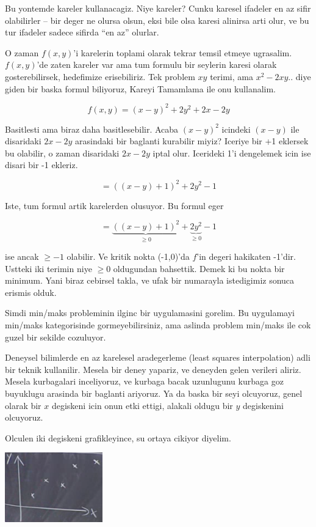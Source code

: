 \documentclass[12pt,fleqn]{article}
\begin{document}
Bu yontemde kareler kullanacagiz. Niye kareler? Cunku karesel ifadeler en
az sifir olabilirler -- bir deger ne olursa olsun, eksi bile olsa karesi
alinirsa arti olur, ve bu tur ifadeler sadece sifirda ``en az'' olurlar.

O zaman $f(x,y)$'i karelerin toplami olarak tekrar temsil etmeye
ugrasalim. $f(x,y)$'de zaten kareler var ama tum formulu bir seylerin
karesi olarak gosterebilirsek, hedefimize erisebiliriz. Tek problem $xy$
terimi, ama $x^2 - 2xy..$ diye giden bir baska formul biliyoruz, Kareyi
Tamamlama ile onu kullanalim.

\[ f(x,y) = (x-y)^2 + 2y^2 + 2x - 2y \]

Basitlesti ama biraz daha basitlesebilir. Acaba $(x-y)^2$ icindeki $(x-y)$
ile disaridaki $2x - 2y$ arasindaki bir baglanti kurabilir miyiz? Iceriye
bir +1 eklersek bu olabilir, o zaman disaridaki $2x - 2y$ iptal
olur. Icerideki 1'i dengelemek icin ise disari bir -1 ekleriz.

\[  = ((x-y) + 1)^2 + 2y^2 - 1\]

Iste, tum formul artik karelerden olusuyor. Bu formul eger 

\[  = \underbrace{((x-y) + 1)^2}_{\ge 0} + \underbrace{2y^2}_{\ge 0} - 1\]

ise ancak $\ge -1$ olabilir. Ve kritik nokta (-1,0)'da $f$'in degeri
hakikaten -1'dir. Ustteki iki terimin niye $\ge 0$ oldugundan
bahsettik. Demek ki bu nokta bir minimum.  Yani biraz cebirsel takla, ve
ufak bir numarayla istedigimiz sonuca erismis olduk.

Simdi min/maks probleminin ilginc bir uygulamasini gorelim. Bu uygulamayi
min/maks kategorisinde gormeyebilirsiniz, ama aslinda problem min/maks ile
cok guzel bir sekilde cozuluyor.

Deneysel bilimlerde en az karelesel aradegerleme (least squares
interpolation) adli bir teknik kullanilir. Mesela bir deney yapariz, ve
deneyden gelen verileri aliriz. Mesela kurbagalari inceliyoruz, ve kurbaga
bacak uzunlugunu kurbaga goz buyuklugu arasinda bir baglanti ariyoruz. Ya
da baska bir seyi olcuyoruz, genel olarak bir $x$ degiskeni icin onun etki
ettigi, alakali oldugu bir $y$ degiskenini olcuyoruz. 

Olculen iki degiskeni grafikleyince, su ortaya cikiyor diyelim.

\includegraphics[height=3cm]{9_5.png}
\end{document}
